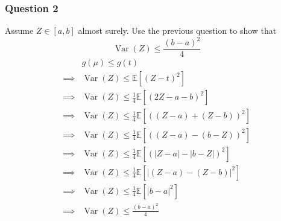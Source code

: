 \documentclass{article}
\newcommand{\1}{\mathbf{1}}
\newcommand{\E}{\mathbb{E}}
\newcommand{\var}{\operatorname{Var}}
\begin{document}
\subsubsection{Question 2}
Assume \(Z \in \left[a,b\right]\) almost surely. Use the previous question to show that
\begin{equation*}
  \var(Z) \leq \frac{(b-a)^2}{4}
\end{equation*}
\begin{align*}
           &
  g(\mu) \leq g(t)                                                          \\
  \implies &
  \var(Z) \leq \E\left[(Z-t)^2\right]                                       \\
  \implies &
  \var(Z) \leq \frac{1}{4} \E\left[\left(2Z - a - b \right)^2\right]        \\
  \implies &
  \var(Z) \leq \frac{1}{4} \E\left[\left((Z - a) + (Z - b) \right)^2\right] \\
  \implies &
  \var(Z) \leq \frac{1}{4} \E\left[\left((Z - a) - (b - Z) \right)^2\right] \\
  \implies &
  \var(Z) \leq \frac{1}{4} \E\left[\left(|Z - a| - |b - Z| \right)^2\right] \\
  \implies &
  \var(Z) \leq \frac{1}{4} \E\left[\left|(Z - a) - (Z - b)\right|^2\right]  \\
  \implies &
  \var(Z) \leq \frac{1}{4} \E\left[\left|b-a\right|^2\right]                \\
  \implies &
  \var(Z) \leq \frac{\left(b-a\right)^2}{4}                                 \\
\end{align*}
\end{document}
